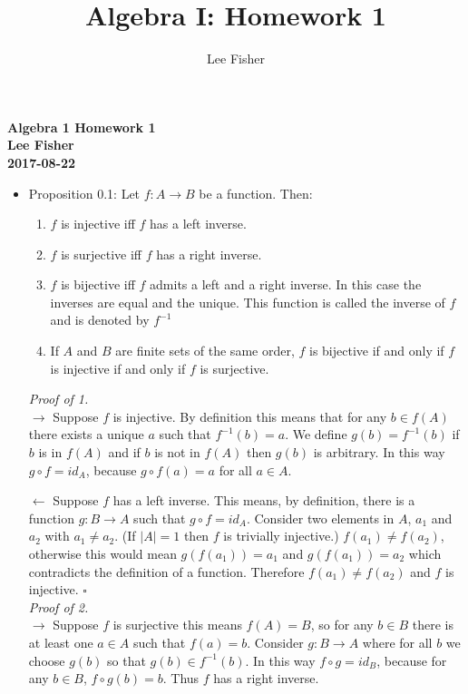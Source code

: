 \documentclass[12pt]{report}
\title{\textbf{Algebra I: Homework 1}}
\author{Lee Fisher}
\date{}
\begin{document}
\textbf{Algebra 1 Homework 1}\\
\indent \textbf{Lee Fisher}\\
\indent \textbf{2017-08-22}

\begin{itemize}
\item Proposition 0.1: Let $f:A \to B$ be a function. Then:
\begin{enumerate}
\item $f$ is injective iff $f$ has a left inverse.
\item $f$ is surjective iff $f$ has a right inverse.
\item $f$ is bijective iff $f$ admits a left and a right inverse. In this case the inverses are equal and the unique.
      This function is called the inverse of $f$ and is denoted by $f^{-1}$
\item If $A$ and $B$ are finite sets of the same order, $f$ is bijective if and only if $f$ is injective if and only if
      $f$ is surjective.
\end{enumerate}

\textit{Proof of 1.}\\
$\rightarrow$ Suppose $f$ is injective. By definition this means that for any $b \in f(A)$ there exists a unique $a$
              such that $f^{-1}(b) = a$. We define $g(b) = f^{-1}(b)$ if $b$ is in $f(A)$ and if $b$ is not in $f(A)$
              then $g(b)$ is arbitrary. In this way $g \circ f = id_A$, because $g \circ f(a) = a$ for all $a \in A$.

$\leftarrow$ Suppose $f$ has a left inverse. This means, by definition, there is a function $g:B \to A$ such that
             $g\circ f = id_A$. Consider two elements in $A$, $a_1$ and $a_2$ with $a_1 \neq a_2$. (If $|A|=1$ then $f$
             is trivially injective.) $f(a_1) \neq f(a_2)$, otherwise this would mean $g(f(a_1)) = a_1$ and
             $g(f(a_1)) = a_2$ which contradicts the definition of a function. Therefore $f(a_1) \neq f(a_2)$ and $f$ is
             injective. $\square$\\

\textit{Proof of 2.}\\
$\rightarrow$ Suppose $f$ is surjective this means $f(A) = B$, so for any $b \in B$ there is at least one $a \in A$ such
              that $f(a) = b$. Consider $g:B \to A$ where for all $b$ we choose $g(b)$ so that $g(b) \in f^{-1}(b)$. In
              this way $f \circ g = id_B$, because for any $b \in B$, $f \circ g(b) = b$. Thus $f$ has a right inverse.


\end{itemize}
\end{document}
